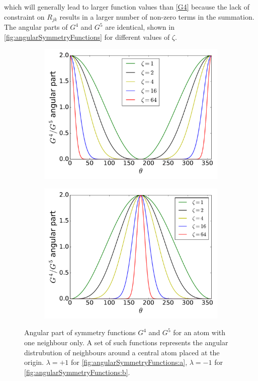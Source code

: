 \documentclass[twoside,english]{uiofysmaster}
\begin{document}
which will generally lead to larger function values than \eqref{G4} because the lack of constraint on $R_{jk}$ results in 
a larger number of non-zero terms in the summation. The angular parts of $G^4$ and $G^5$ are identical, shown in 
\autoref{fig:angularSymmetryFunctions} for different values of $\zeta$. 
\begin{figure}[h]
  \begin{subfigure}[b]{0.5\linewidth}
    \centering
    \includegraphics[width=\linewidth]{Figures/Theory/G4G5angular1.pdf}
    \subcaption{}
    \label{fig:angularSymmetryFunctions:a} 
  \end{subfigure}%
  \begin{subfigure}[b]{0.5\linewidth}
    \centering
    \includegraphics[width=\linewidth]{Figures/Theory/G4G5angular2.pdf} 
    \subcaption{}
    \label{fig:angularSymmetryFunctions:b} 
  \end{subfigure} 
  \caption{Angular part of symmetry functions $G^4$ and $G^5$ for an atom with one neighbour only. A set of such 
	   functions represents the angular distrubution of neighbours around a central atom placed at the origin.
	   $\lambda = +1$ for \autoref{fig:angularSymmetryFunctions:a}, $\lambda=-1$ for \autoref{fig:angularSymmetryFunctions:b}.}
 \label{fig:angularSymmetryFunctions} 
\end{figure}
\end{document}
